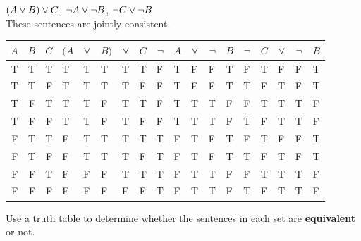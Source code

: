 \begin{earg}
\item $(A \vee B) \vee C$, ${\neg} A \vee {\neg} B$, ${\neg} C \vee {\neg} B$\\
These sentences are jointly consistent.
\begin{flushleft}
\begin{tabular}{d d d | f  e e e h | f e e e h | f e e e e}
$A$ & $B$ & $C$ & $(A$ & $\vee$ & $B)$ & $\vee$ & $C$ & ${\neg}$ & $A$ & $\vee$ & ${\neg}$ & $B$ & ${\neg}$ & $C$ & $\vee$ & ${\neg}$ & $B$\\
\hline
T & T & T &      T & T & T &   T & T &      F & T & F & F & T &      F & T & F & F & T\Tstrut\\
T & T & F &      T & T & T &   T & F &      F & T & F & F & T &      T & F & T & F & T\\
T & F & T &      T & T & F &   T & T &      F & T & T & T & F &      F & T & T & T & F\\   
T & F & F &      T & T & F &   T & F &      F  &T & T & T & F &      T & F & T & T & F\\\hline
F & T & T &      F & T & T &   T & T &      T & F & T & F & T &      F & T & F & F & T\Tstrut\\   
F & T & F &      F & T & T &   T & F &      T & F & T & F & T &      T & F & T & F & T\\   
F & F & T &      F & F & F &   T & T &      T  &F & T & T & F &      F & T & T & T & F\\   
F & F & F &      F & F & F &   F & F &     T & F & T & T & F &      T & F & T & T & F 
\end{tabular}
\end{flushleft}\medskip

\end{earg}


\problempart
\label{pr.TT.equiv}
Use a truth table to determine whether the sentences in each set are \textbf{equivalent} or not.

